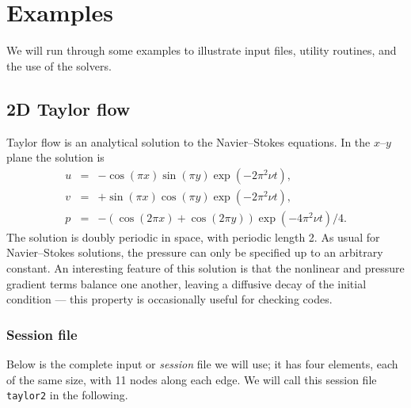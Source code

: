 \documentclass[11pt,a4paper]{report}
\begin{document}
\chapter{Examples}

We will run through some examples to illustrate input files, utility
routines, and the use of the solvers.

\section{2D Taylor flow}

Taylor flow is an analytical solution to the Navier--Stokes equations.
In the $x$--$y$ plane the solution is 
\begin{eqnarray}
        u &=& -\cos(\pi x) \sin(\pi y) \exp(-2\pi^2\nu t),\\
        v &=& +\sin(\pi x) \cos(\pi y) \exp(-2\pi^2\nu t),\\
        p &=& -(\cos(2\pi x) + \cos(2\pi y)) \exp(-4\pi^2\nu t)/4.
\end{eqnarray}
The solution is doubly periodic in space, with periodic length 2.  As
usual for Navier--Stokes solutions, the pressure can only be specified
up to an arbitrary constant.  An interesting feature of this solution
is that the nonlinear and pressure gradient terms balance one another,
leaving a diffusive decay of the initial condition --- this property
is occasionally useful for checking codes.

\subsection{Session file}

Below is the complete input or \textsl{session} file we will use; it
has four elements, each of the same size, with 11 nodes along each
edge.  We will call this session file \texttt{taylor2} in the
following.
\end{document}

